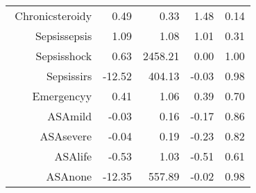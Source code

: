\begin{tabular}{rrrrr}
$$  Chronic\-steroid\-y & 0.49 & 0.33 & 1.48 & 0.14 \\ 
  Sepsis\-sepsis & 1.09 & 1.08 & 1.01 & 0.31 \\ 
  Sepsis\-shock & 0.63 & 2458.21 & 0.00 & 1.00 \\ 
  Sepsis\-sirs & -12.52 & 404.13 & -0.03 & 0.98 \\ 
  Emergency\-y & 0.41 & 1.06 & 0.39 & 0.70 \\ 
  ASA\-mild & -0.03 & 0.16 & -0.17 & 0.86 \\ 
  ASA\-severe & -0.04 & 0.19 & -0.23 & 0.82 \\ 
  ASA\-life & -0.53 & 1.03 & -0.51 & 0.61 \\ 
  ASA\-none & -12.35 & 557.89 & -0.02 & 0.98 \\ 
   \hline
\end{tabular}

